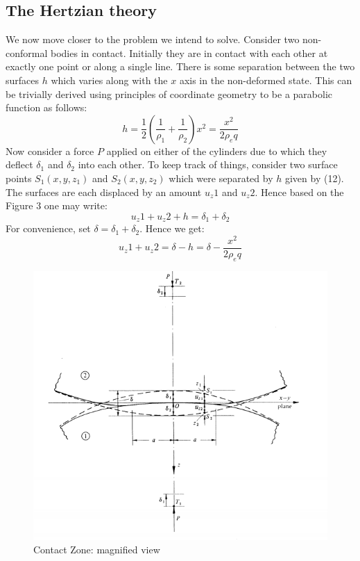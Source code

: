 \documentclass{article}
\begin{document}
\subsection{The Hertzian theory}
We now move closer to the problem we intend to solve. Consider two non-conformal bodies in contact. Initially they are in contact with each other at exactly one point or along a single line. There is some separation between the two surfaces $h$ which varies along with the $x$ axis in the non-deformed state. This can be trivially derived using principles of coordinate geometry to be a parabolic function as follows: 
\[
h = \frac{1}{2}(\frac{1}{\rho_1} + \frac{1}{\rho_2})x^2 = \frac{x^2}{2\rho_eq} \tag{12}
\]
Now consider a force $P$ applied on either of the cylinders due to which they deflect $\delta_1$ and $\delta_2$ into each other. To keep track of things, consider two surface points $S_1(x,y,z_1)$ and $S_2(x,y,z_2)$ which were separated by $h$ given by (12). The surfaces are each displaced by an amount $u_z1$ and $u_z2$. 
Hence based on the Figure 3 one may write:
\[
u_z1 + u_z2 + h = \delta_1 + \delta_2 \tag{13} \label{eq:13}
\]
For convenience, set $\delta = \delta_1 + \delta_2$. Hence we get: 
\[
u_z1 + u_z2 = \delta - h = \delta - \frac{x^2}{2\rho_e q} \tag{14} \label{eq:14}  
\]
\begin{figure}[h]
 \centering
 \includegraphics{contact_zone}
 \caption{Contact Zone: magnified view}
 \label{Figure 3:}
\end{figure}
\end{document}
